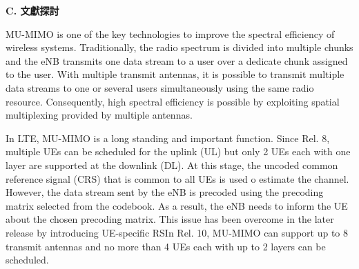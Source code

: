 \documentclass[a4paper,12pt]{article}%
\begin{document}




\noindent \textbf{C. 文獻探討}

MU-MIMO is one of the key technologies to improve the spectral efficiency of wireless systems. Traditionally, the radio spectrum is divided into multiple chunks and the eNB transmits one data stream to a user over a dedicate chunk assigned to the user. With multiple transmit antennas, it is possible to transmit multiple data streams to one or several users simultaneously using the same radio resource. Consequently, high spectral efficiency is possible by exploiting spatial multiplexing provided by multiple antennas.

In LTE, MU-MIMO is a long standing and important function. Since Rel. 8, multiple UEs can be scheduled for the uplink (UL) but only 2 UEs each with one layer are supported at the downlink (DL). At this stage, the uncoded common reference signal (CRS) that is common to all UEs is used o estimate the channel. However, the data stream sent by the eNB is precoded using the precoding matrix selected from the codebook. As a result, the eNB needs to inform the UE about the chosen precoding matrix. This issue has been overcome in the later release by introducing UE-specific RSIn Rel. 10, MU-MIMO can support up to 8 transmit antennas and no more than 4 UEs each with up to 2 layers can be scheduled.
 
\end{document}
